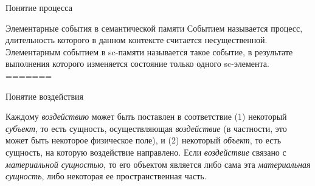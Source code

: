 \begin{frame}{\large Понятие процесса}
\begin{frame}{\large Элементарные события в семантической памяти}
\vspace{25}
    Событием называется процесс, длительность которого в данном контексте считается несущественной.\\
    Элементарным событием в sc-памяти называется такое событие, в результате выполнения которого изменяется состояние только одного sc-элемента.
=======
\begin{frame}{Понятие воздействия}
\topline
 \begin{SCn}
	\begin{scnindent}
	\end{scnindent}

\end{SCn}
\end{frame}
\begin{frame}{}
\begin{SCn}	
	

\end{SCn}
\end{frame}

\begin{frame}{}
    \begin{SCn}
        Каждому \textit{воздействию} может быть поставлен в соответствие (1) некоторый \textit{субъект\scnrolesign}, то есть сущность, осуществляющая \textit{воздействие} (в частности, это может быть некоторое физическое поле), и (2) некоторый \textit{объект\scnrolesign}, то есть сущность, на которую воздействие направлено. Если \textit{воздействие} связано с \textit{материальной сущностью}, то его объектом является либо сама эта \textit{материальная сущность}, либо некоторая ее пространственная часть.


\end{SCn}
\end{frame}
\end{frame}
\end{frame}
